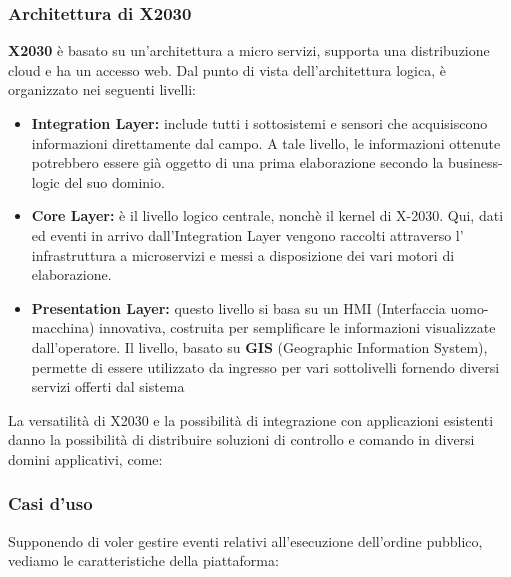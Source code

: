 \subsubsection{Architettura di X2030}
\textbf{X2030} è basato su un'architettura a micro servizi,
supporta una distribuzione cloud e ha un accesso web.
Dal punto di vista dell'architettura logica,
è organizzato nei seguenti livelli:
\begin{itemize}
    \item \textbf{Integration Layer:} include tutti i sottosistemi e
    sensori che acquisiscono informazioni direttamente dal 
    campo. A tale livello, le informazioni ottenute
    potrebbero essere già oggetto di una prima elaborazione
    secondo la business-logic del suo dominio.
    \item \textbf{Core Layer:} è il livello logico centrale, nonchè il
    kernel di X-2030. Qui, dati ed eventi in arrivo
    dall'Integration Layer vengono raccolti attraverso l'
    infrastruttura a microservizi e messi
    a disposizione dei vari motori di elaborazione.
    \item \textbf{Presentation Layer:} questo livello si basa su
    un HMI (Interfaccia uomo-macchina) innovativa, costruita per semplificare le
    informazioni visualizzate dall'operatore. Il livello, basato su 
    \textbf{GIS} (Geographic Information System),
    permette di essere utilizzato da ingresso per vari sottolivelli fornendo
    diversi servizi offerti dal sistema
\end{itemize}



La versatilità di X2030 e la possibilità di integrazione
con applicazioni esistenti danno la possibilità di distribuire 
soluzioni di controllo e comando in diversi domini applicativi,
come:





\subsubsection{Casi d'uso}
Supponendo di voler gestire eventi relativi all'esecuzione 
dell'ordine pubblico, vediamo le caratteristiche della piattaforma:

